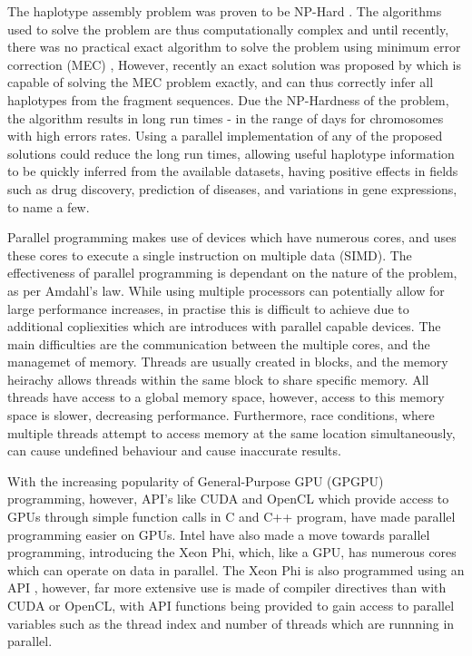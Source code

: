 \documentclass[10pt,twocolumn]{witseiepaper}
\begin{document}
The haplotype assembly problem was proven to be NP-Hard \cite{lippert:2002}. The algorithms used to solve the
problem are thus computationally complex and until recently, there was no practical exact algorithm to solve 
the problem using minimum error correction (MEC) \cite{bonizzoni:2003},
However, recently an exact solution was proposed by \cite{chen:2013} which is capable of solving the MEC 
problem exactly, and can thus correctly infer all haplotypes from the fragment sequences. Due the NP-Hardness 
of the problem, the algorithm results in long run times - in the range of days for chromosomes with high
errors rates. Using a parallel implementation of any of the proposed solutions could reduce the long run
times, allowing useful haplotype information to be quickly inferred from the available datasets, having
positive effects in fields such as drug discovery, prediction of diseases, and variations in gene
expressions, to name a few. 

Parallel programming makes use of devices which have numerous cores, and uses these cores to execute a single
instruction on multiple data (SIMD). The effectiveness of parallel programming is dependant on the nature of 
the problem, as per Amdahl's law. While using multiple processors can potentially allow for large performance 
increases, in practise this is difficult to achieve due to additional copliexities which are introduces with 
parallel capable devices. The main difficulties are the communication between the multiple cores, and the 
managemet of memory. Threads are usually created in blocks, and the memory heirachy allows threads within the 
same block to share specific memory. All threads have access to a global memory space, however, access to this 
memory space is slower, decreasing performance. Furthermore, race conditions, where multiple threads attempt to 
access memory at the same location simultaneously, can cause undefined behaviour and cause inaccurate results. 

With the increasing popularity of General-Purpose GPU (GPGPU) programming, however, API's like CUDA
\cite{nvidia:2015} and OpenCL \cite{khronos:2015}
which provide access to GPUs through simple function calls in C and C++ program, have made parallel programming
easier on GPUs. Intel have also made a move towards parallel programming, introducing the Xeon Phi, which, like 
a GPU, has numerous cores which can operate on data in parallel. The Xeon Phi is also programmed using an API 
\cite{intel:2013}, however, far more extensive use is made of compiler directives than with CUDA or OpenCL, 
with API functions being provided to gain access to parallel variables such as the thread index and number of 
threads which are runnning in parallel. 
\end{document}
